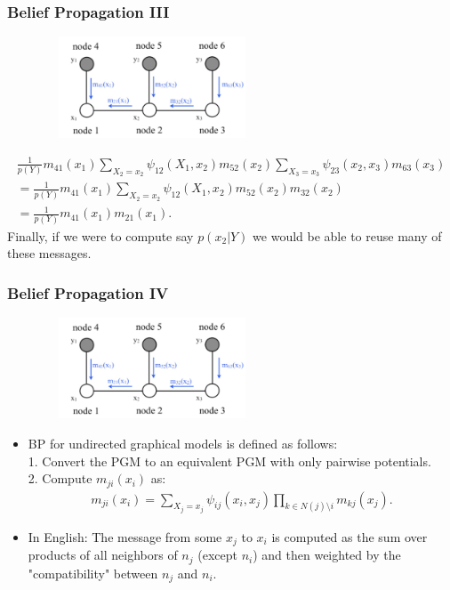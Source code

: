 \documentclass{beamer}
\begin{document}
\begin{frame}
\frametitle{Belief Propagation III}
\begin{figure}
	\begin{center}
		\includegraphics[width=6.5cm, height=3cm]{bp}
	\end{center}
\end{figure}
\begin{gather*}
\frac{1}{p(Y)} m_{41}(x_1) \sum_{X_2 = x_2} \psi_{12}(X_1, x_2) m_{52}(x_2) \sum_{X_3 = x_3} \psi_{23}(x_2, x_3) m_{63}(x_3)\\
= \frac{1}{p(Y)} m_{41}(x_1) \sum_{X_2 = x_2} \psi_{12}(X_1, x_2) m_{52}(x_2) m_{32}(x_2)\\
= \frac{1}{p(Y)} m_{41}(x_1) m_{21}(x_1).
\end{gather*}
Finally, if we were to compute say $p(x_2 | Y)$ we would be able to reuse many of these messages.
\end{frame}

\begin{frame}
\frametitle{Belief Propagation IV}
\begin{figure}
	\begin{center}
		\includegraphics[width=6.5cm, height=3cm]{bp}
	\end{center}
\end{figure}
\begin{itemize}
	\item BP for undirected graphical models is defined as follows:\\
	1.  Convert the PGM to an equivalent PGM with only pairwise potentials.\\
	2.  Compute $m_{ji}(x_i)$ as:
	\begin{gather*}
	m_{ji}(x_i) = \sum_{X_j = x_j} \psi_{ij}(x_i, x_j) \prod_{k \in N(j) \setminus i} m_{kj}(x_j).
	\end{gather*}
	\item In English: The message from some $x_j$ to $x_i$ is computed as the sum over products of all neighbors of $n_j$ (except $n_i$) and then weighted by the "compatibility" between $n_j$ and $n_i$.
\end{itemize}
\end{frame}
\end{document}
